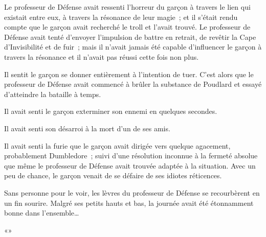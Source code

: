 Le professeur de Défense avait ressenti l'horreur du garçon à travers le lien qui existait entre eux, à travers la résonance de leur magie~; et il s'était rendu compte que le garçon avait recherché le troll et l'avait trouvé. Le professeur de Défense avait tenté d'envoyer l'impulsion de battre en retrait, de revêtir la Cape d'Invisibilité et de fuir~; mais il n'avait jamais été capable d'influencer le garçon à travers la résonance et il n'avait pas réussi cette fois non plus.

Il sentit le garçon se donner entièrement à l'intention de tuer. C'est alors que le professeur de Défense avait commencé à brûler la substance de Poudlard et essayé d'atteindre la bataille à temps.

Il avait senti le garçon exterminer son ennemi en quelques secondes.

Il avait senti son désarroi à la mort d'un de ses amis.

Il avait senti la furie que le garçon avait dirigée vers quelque agacement, probablement Dumbledore~; suivi d'une résolution inconnue à la fermeté absolue que même le professeur de Défense avait trouvée adaptée à la situation. Avec un peu de chance, le garçon venait de se défaire de ses idiotes réticences.

Sans personne pour le voir, les lèvres du professeur de Défense se recourbèrent en un fin sourire. Malgré ses petits hauts et bas, la journée avait été étonnamment bonne dans l'ensemble…

«»
